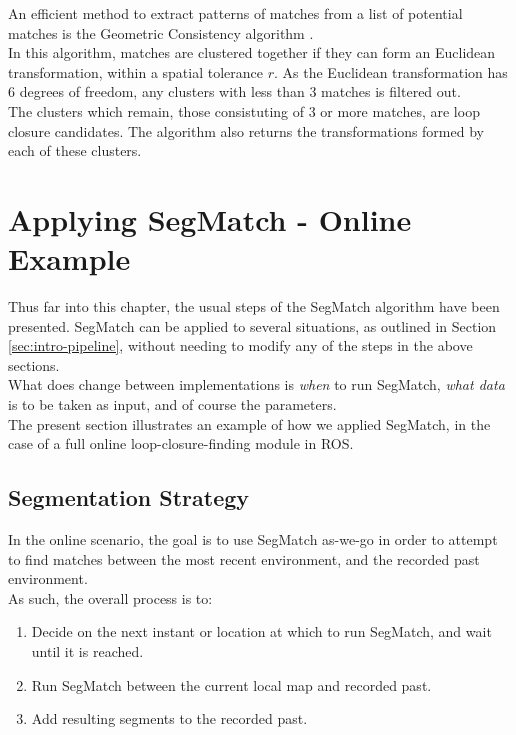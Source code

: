 An efficient method to extract patterns of matches from a list of potential matches is the Geometric Consistency algorithm \cite{geometric-consistency}.\\

In this algorithm, matches are clustered together if they can form an Euclidean transformation, within a spatial tolerance $r$. As the Euclidean transformation has 6 degrees of freedom, any clusters with less than 3 matches is filtered out.\\

The clusters which remain, those consistuting of 3 or more matches, are loop closure candidates. The algorithm also returns the transformations formed by each of these clusters.\\

\section{Applying SegMatch - Online Example}
\label{sec:online}

Thus far into this chapter, the usual steps of the SegMatch algorithm have been presented. SegMatch can be applied to several situations, as outlined in Section \ref{sec:intro-pipeline}, without needing to modify any of the steps in the above sections.\\

What does change between implementations is \textit{when} to run SegMatch, \textit{what data} is to be taken as input, and of course the parameters.\\

The present section illustrates an example of how we applied SegMatch, in the case of a full online loop-closure-finding module in ROS.

\subsection{Segmentation Strategy}
\label{subsec:segmentation-strategy}

In the online scenario, the goal is to use SegMatch as-we-go in order to attempt to find matches between the most recent environment, and the recorded past environment.\\

As such, the overall process is to:   

\begin{enumerate}
\item Decide on the next instant or location at which to run SegMatch, and wait until it is reached.
\item Run SegMatch between the current local map and recorded past.
\item Add resulting segments to the recorded past.
\end{enumerate}

